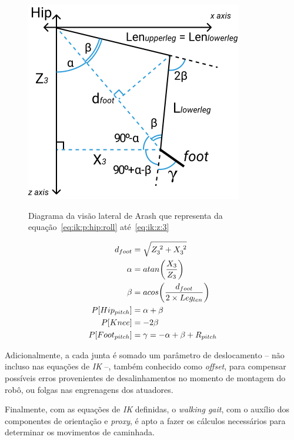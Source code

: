 \begin{figure}[htb]
	\centering
	\includegraphics[scale=1.5]{imagens/svg/inverse-kinematics-sideview}
	\caption{Diagrama da visão lateral de Arash que representa da equação~\ref{eq:ik:p:hip:roll} até~\ref{eq:ik:z:3}}
	\caption*{\cite{karimionline}}
	\label{fig:ik:sideview}
\end{figure}

\begin{align}
	       d_{foot} &= \sqrt{Z_3^{\hspace{1mm}2} + X_3^{\hspace{1mm}2}}     \label{eq:ik:d:foot}        \\
	         \alpha &= atan\bigg(\dfrac{X_3}{Z_3}\bigg)                      \label{eq:ik:alpha}         \\
	          \beta &= acos\bigg(\dfrac{d_{foot}}{2 \times Leg_{len}}\bigg)   \label{eq:ik:beta}          \\
	 P[Hip_{pitch}] &= \alpha + \beta                                          \label{eq:ik:p:hip:pitch}   \\
	        P[Knee] &= -2 \beta                                                 \label{eq:ik:p:knee}        \\
	P[Foot_{pitch}] &= \gamma = -\alpha + \beta + R_{pitch}                      \label{eq:ik:p:foot:pitch}
\end{align}

Adicionalmente, a cada junta é somado um parâmetro de deslocamento -- não incluso nas equações de \textit{IK} --, também conhecido como \textit{offset}, para compensar possíveis erros provenientes de desalinhamentos no momento de montagem do robô, ou folgas nas engrenagens dos atuadores.

Finalmente, com as equações de \textit{IK} definidas, o \textit{walking gait}, com o auxílio dos componentes de orientação e \textit{proxy}, é apto a fazer os cálculos necessários para determinar os movimentos de caminhada.
